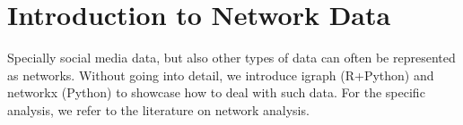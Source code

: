 \chapter{Introduction to Network Data}
\label{chap:network}

Specially social media data, but also other types of data can often be represented as networks. Without going into detail, we introduce igraph (R+Python) and networkx (Python) to showcase how to deal with such data. For the specific analysis, we refer to the literature on network analysis.




